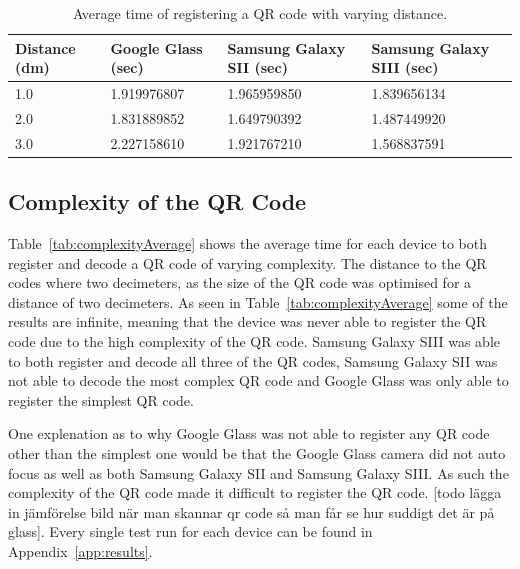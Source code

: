 	\begin{table}[H]%
    		\caption{Average time of registering a QR code with varying distance.} \label{tab:distanceAverage}
		\centering \begin{tabularx}{\textwidth}{l|X|X|X} \hline
		\textbf{Distance (dm)} & \textbf{Google Glass (sec)} & \textbf{Samsung Galaxy SII (sec)} & \textbf{Samsung Galaxy SIII (sec)} \\ \hline \hline
       
		1.0	&1.919976807	&1.965959850	&1.839656134	\\ \hline
		2.0	&1.831889852	&1.649790392	&1.487449920	\\ \hline
		3.0	&2.227158610	&1.921767210	&1.568837591	\\ \hline
		
		\end{tabularx}
	\end{table}

\subsection{Complexity of the QR Code}

Table~\ref{tab:complexityAverage} shows the average time for each device to both register and decode a QR code of varying complexity. The distance to the QR codes where two decimeters, as the size of the QR code was optimised for a distance of two decimeters. As seen in Table~\ref{tab:complexityAverage} some of the results are infinite, meaning that the device was never able to register the QR code due to the high complexity of the QR code. Samsung Galaxy SIII was able to both register and decode all three of the QR codes, Samsung Galaxy SII was not able to decode the most complex QR code and Google Glass was only able to register the simplest QR code.

One explenation as to why Google Glass was not able to register any QR code other than the simplest one would be that the Google Glass camera did not auto focus as well as both Samsung Galaxy SII and Samsung Galaxy SIII. As such the complexity of the QR code made it difficult to register the QR code. [todo lägga in jämförelse bild när man skannar qr code så man får se hur suddigt det är på glass]. Every single test run for each device can be found in Appendix~\ref{app:results}.

